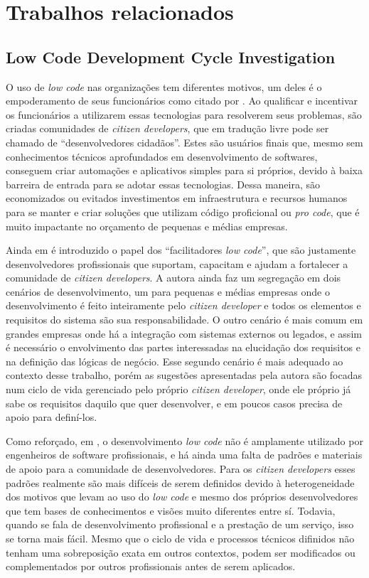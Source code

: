 	\section{Trabalhos relacionados}
		
		\subsection{Low Code Development Cycle Investigation}
		O uso de \textit{low code} nas organizações tem diferentes motivos, um deles é o empoderamento de seus funcionários como citado por \cite{LowCodeLifeCicle}. 
		Ao qualificar e incentivar os funcionários a utilizarem essas tecnologias para resolverem seus problemas, são criadas comunidades de \textit{citizen developers}, que em tradução livre pode ser 
		chamado de ``desenvolvedores cidadãos''. Estes são usuários finais que, mesmo sem conhecimentos técnicos aprofundados em desenvolvimento de softwares, conseguem criar automações e aplicativos 
		simples para si próprios, devido à baixa barreira de entrada para se adotar essas tecnologias. Dessa maneira, são economizados ou evitados investimentos em
		infraestrutura e recursos humanos para se manter e criar soluções que utilizam código proficional ou \textit{pro code}, que é muito impactante no orçamento de pequenas e médias empresas.

		Ainda em \cite{LowCodeLifeCicle} é introduzido o papel dos ``facilitadores \textit{low code}'', que são justamente desenvolvedores profissionais que suportam, capacitam e ajudam a
		fortalecer a comunidade de \textit{citizen developers}. A autora ainda faz um segregação em dois cenários de desenvolvimento, um para pequenas e médias empresas onde o desenvolvimento
		é feito inteiramente pelo \textit{citizen developer} e todos os elementos e requisitos do sistema são sua responsabilidade. O outro cenário é mais comum em grandes empresas onde há 
		a integração com sistemas externos ou legados, e assim é necessário o envolvimento das partes interessadas na elucidação dos requisitos e na definição das lógicas de negócio. Esse
		segundo cenário é mais adequado ao contexto desse trabalho, porém as sugestões apresentadas pela autora são focadas num ciclo de vida gerenciado pelo próprio \textit{citizen developer},
		onde ele próprio já sabe os requisitos daquilo que quer desenvolver, e em poucos casos precisa de apoio para definí-los.

		Como reforçado, em \cite{LowCodeLifeCicle}, o desenvolvimento \textit{low code} não é amplamente utilizado por engenheiros de software profissionais, e há ainda uma falta de padrões e
		materiais de apoio para a comunidade de desenvolvedores. Para os \textit{citizen developers} esses padrões realmente são mais difíceis de serem definidos devido à heterogeneidade dos
		motivos que levam ao uso do \textit{low code} e mesmo dos próprios desenvolvedores que tem bases de conhecimentos e visões muito diferentes entre sí. Todavia, quando se fala de desenvolvimento
		profissional e a prestação de um serviço, isso se torna mais fácil. Mesmo que o ciclo de vida e processos técnicos difinidos não tenham uma sobreposição exata em outros contextos, podem 
		ser modificados ou complementados por outros profissionais antes de serem aplicados.
		
